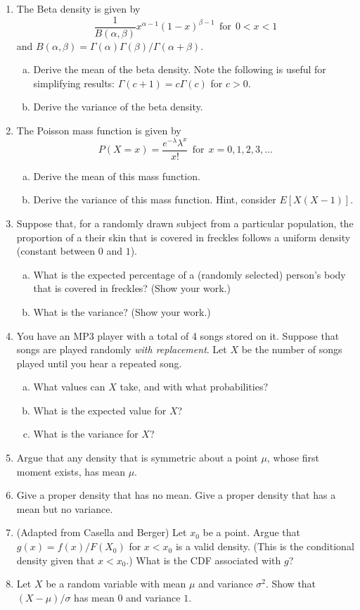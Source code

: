 \documentclass[12pt]{article}
\begin{document}
\begin{enumerate}[1.]
\item The Beta density is given by 
$$
\frac{1}{B(\alpha, \beta)} x^{\alpha - 1}(1 - x)^{\beta - 1} ~~\mbox{for}~~ 0 < x< 1
$$
and
$
B(\alpha, \beta) = \Gamma(\alpha)\Gamma(\beta)/\Gamma(\alpha + \beta).
$
\begin{enumerate}[a.]
\item Derive the mean of the beta density. Note the following is useful for simplifying results: $\Gamma(c + 1) = c\Gamma(c)$ for $c > 0$.
\item Derive the variance of the beta density.
\end{enumerate}
\item The Poisson mass function is given by
$$
P(X = x) = \frac{e^{-\lambda} \lambda^x}{x!} ~~ \mbox{for} ~~ x = 0, 1, 2, 3, \ldots
$$
\begin{enumerate}[a.]
\item Derive the mean of this mass function.
\item Derive the variance of this mass function. Hint, consider $E[X(X - 1)]$.
\end{enumerate}
\item Suppose that, for a randomly drawn subject from a particular
  population, the proportion of a their skin that is covered in
  freckles follows a uniform density (constant between $0$ and $1$).  
  \begin{enumerate}[a.]
  \item What is the expected percentage of a (randomly selected) person's body that is covered in freckles? (Show your work.)
  \item What is the variance? (Show your work.) 
  \end{enumerate}
\item  You have an MP3 player with a total of 4 songs stored on it. Suppose that songs are played
  randomly {\em with replacement}. Let $X$ be the number of songs played
  until you hear a repeated song. 
  \begin{enumerate}[a.]
  \item What values can $X$ take, and with what probabilities?
  \item What is the expected value for $X$?
  \item What is the variance for $X$?
  \end{enumerate}
\item Argue that any density that is symmetric about a point $\mu$, 
  whose first moment exists, has mean $\mu$. 
\item Give a proper density that has no mean. Give a proper density
  that has a mean but no variance.
\item (Adapted from Casella and Berger) 
  Let $x_0$ be a point. Argue that $g(x) = f(x) / F(X_0)$ for $x < x_0$ is
  a valid density. (This is the conditional density given that $x < x_0$.)
  What is the CDF associated with $g$? 
\item Let $X$ be a random variable with mean $\mu$ and variance $\sigma^2$. Show
that $(X- \mu) / \sigma$ has mean $0$ and variance $1$.


\end{enumerate}
\end{document}
